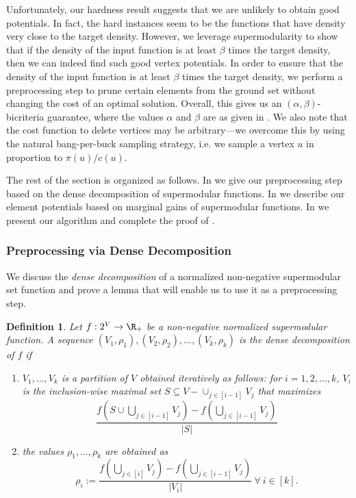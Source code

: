 \documentclass{article}
\newtheorem{definition}{Definition}[section]
\begin{document}
Unfortunately, our hardness result suggests that we are unlikely to obtain good potentials. In fact, the hard instances seem to be the functions that have density very close to the target density. However, we leverage supermodularity to show that if the density of the input function is at least $\beta$ times the target density, then we can indeed find such good vertex potentials. 
In order to ensure that the density of the input function is at least $\beta$ times the target density, we perform a preprocessing step to prune certain elements from the ground set without changing the cost of an optimal solution. 
Overall, this gives us an $(\alpha, \beta)$-bicriteria guarantee, where the values $\alpha$ and $\beta$ are as given in . We also note that the cost function to delete vertices may be arbitrary---we overcome this by using the natural bang-per-buck sampling strategy, i.e. we sample a vertex $u$ in proportion to $\pi(u)/c(u)$.

The rest of the section is organized as follows. 
In  we give our preprocessing step based on the dense decomposition of supermodular functions. 
In  we describe our element potentials based on marginal gains of supermodular functions. 
In  we present our algorithm and complete the proof of .

\subsubsection{Preprocessing via Dense Decomposition}\label{sec:dense-decomposition}
We discuss the \emph{dense decomposition} of a normalized non-negative supermodular set function \cite{hqc-22, Fujishige_1980} and prove a lemma that will enable us to use it as a preprocessing step. 

\begin{definition}\cite{hqc-22}
    Let $f:2^V\rightarrow\R_+$ be a non-negative normalized supermodular function. A sequence $(V_1, \rho_1), (V_2, \rho_2), \ldots, (V_k, \rho_k)$ is the \emph{dense decomposition of $f$} if 
    \begin{enumerate}
        \item $V_1, \ldots, V_k$ is a partition of $V$ obtained iteratively as follows: for $i =1, 2, \ldots, k$, 
        $V_i$ is the inclusion-wise maximal set $S\subseteq V-\cup_{j\in [i-1]}V_j$ that maximizes 
        \[
            \frac{f\left(S \cup \bigcup_{j \in [i-1]}V_j\right) - f\left(\bigcup_{j \in [i-1]}V_j\right)}{|S|}
        \]
   
    \item the values $\rho_1, \ldots, \rho_k$ are obtained as
    $$\rho_i := \frac{f\left(\bigcup_{j \in [i]} V_j\right) - f\left(\bigcup_{j \in [i-1]} V_j\right)}{|V_i|}\ \forall\ i \in [k].$$
    \end{enumerate}
\end{definition}
\end{document}
